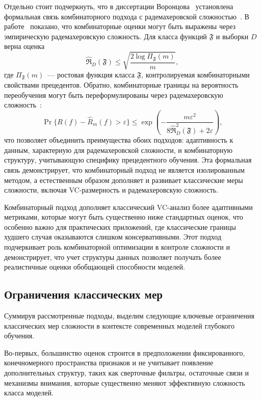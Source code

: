 Отдельно стоит подчеркнуть, что в диссертации Воронцова~\cite{vorontsov2010doctoral} установлена формальная связь комбинаторного подхода с радемахеровской сложностью~\cite{koltchinskii2000RadamakherTheory}. В работе~\cite[раздел~2.2.1]{vorontsov2010doctoral} показано, что комбинаторные оценки могут быть выражены через эмпирическую радемахеровскую сложность. Для класса функций $\mathfrak{F}$ и выборки $D$ верна оценка
\[
\hat{\mathfrak{R}}_D(\mathfrak{F}) \leq \sqrt{\frac{2 \log \Pi_{\mathfrak{F}}(m)}{m}},
\]
где $\Pi_{\mathfrak{F}}(m)$~--- ростовая функция класса $\mathfrak{F}$, контролируемая комбинаторными свойствами прецедентов. Обратно, комбинаторные границы на вероятность переобучения могут быть переформулированы через радемахеровскую сложность~\cite[раздел~2.2]{vorontsov2010doctoral}:
\[
\Pr\{R(f) - \hat{R}_m(f) > \varepsilon\} \leq \exp\left(-\frac{m \varepsilon^2}{8 \hat{\mathfrak{R}}_D^2(\mathfrak{F}) + 2\varepsilon}\right),
\]
что позволяет объединить преимущества обоих подходов: адаптивность к данным, характерную для радемахеровской сложности, и комбинаторную структуру, учитывающую специфику прецедентного обучения. Эта формальная связь демонстрирует, что комбинаторный подход не является изолированным методом, а естественным образом дополняет и развивает классические меры сложности, включая VC-размерность и радемахеровскую сложность.

Комбинаторный подход дополняет классический VC-анализ более адаптивными метриками, которые могут быть существенно ниже стандартных оценок, что особенно важно для практических приложений, где классические границы худшего случая оказываются слишком консервативными. Этот подход подчеркивает роль комбинаторной оптимизации в контроле сложности и демонстрирует, что учет структуры данных позволяет получать более реалистичные оценки обобщающей способности моделей.

\subsection{Ограничения классических мер}

Суммируя рассмотренные подходы, выделим следующие ключевые ограничения классических мер сложности в контексте современных моделей глубокого обучения.

Во-первых, большинство оценок строится в предположении фиксированного, конечномерного пространства признаков и не учитывает появление дополнительных структур, таких как сверточные фильтры, остаточные связи и механизмы внимания, которые существенно меняют эффективную сложность класса моделей.

